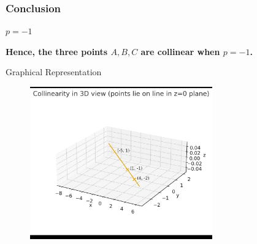 \documentclass{beamer}
\theoremstyle{remark}
\begin{document}
\begin{frame}
\frametitle{Conclusion}

$
p = -1
$

\bigskip

\textbf{Hence, the three points $A,B,C$ are collinear when $p=-1$.}
\end{frame}
\begin{frame}{Graphical Representation}

\begin{figure}[ht!]
    \centering
    \includegraphics[width=0.7\textwidth]{matgeo-1.7.5.jpeg}
    \caption{}
    \label{fig:1.7.5.jpg}
\end{figure}

\end{frame}
\end{document}
